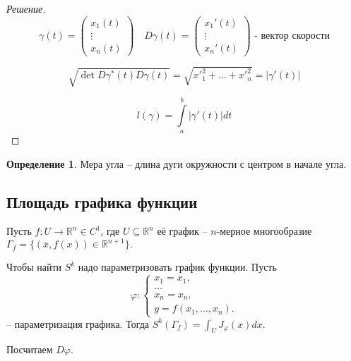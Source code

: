 \documentclass[a5paper]{article}
\newcounter{through}
\theoremstyle{plain}
\theoremstyle{definition}
\newtheorem{definition}[through]{Определение}
\numberwithin{through}{section}
\numberwithin{equation}{section}
\begin{document}
\begin{proof}[Решение]
	\begin{equation*}
	\gamma(t) = 
	\begin{pmatrix}
	x_1(t) \\
	\vdots \\
	x_n(t)
	\end{pmatrix}
	\quad	
	D \gamma(t) = 
	\begin{pmatrix}
	x_1'(t) \\
	\vdots \\
	x_n'(t)
	\end{pmatrix} 
	\text{ - вектор скорости}
	\end{equation*}
	
	\begin{equation*}
	\sqrt{\det D \gamma^* (t) D \gamma (t)} = \sqrt{{x'}_1^2 + \ldots + {x'}_n^2} = |\gamma'(t)|
	\end{equation*}
	
	\begin{equation*}
	l(\gamma) = \int\limits_{a}^{b} |\gamma'(t)|dt
	\end{equation*}
\end{proof}


\begin{definition}
	Мера угла -- длина дуги окружности с центром в начале угла.
\end{definition}


\subsection{Площадь графика функции}


Пусть $f: U \to \mathbb{R}^n \in C^1$, где $U \subseteq \mathbb{R}^n$ её график -- $n$-мерное многообразие 
$\Gamma_f = \{ (\bar{x}, f(x)) \in \mathbb{R}^{n + 1} \}.$

Чтобы найти $S^k$ надо параметризовать график функции. 
Пусть 
\begin{equation*}
\varphi:
	\begin{cases}
	x_1 = x_1, \\
	\ldots \\
	x_n = x_n, \\
	y = f(x_1, \ldots, x_n).
	\end{cases}
\end{equation*}
-- параметризация графика.
Тогда $S^k(\Gamma_f) = \int_U J_{\varphi}(x) dx.$

Посчитаем $D\varphi$. 
\end{document}
